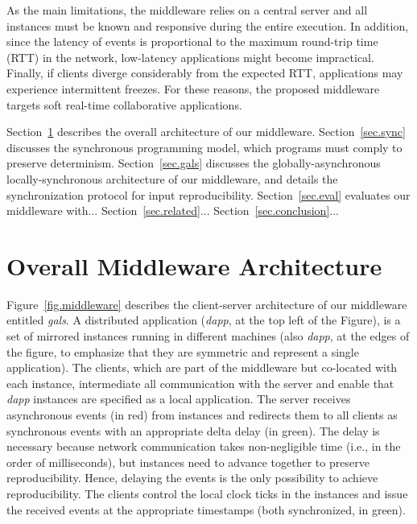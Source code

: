 \documentclass[sigplan,screen]{acmart}
\newcommand{\dapp}{\emph{dapp}\xspace}
\begin{document}
As the main limitations, the middleware relies on a central server and all
instances must be known and responsive during the entire execution.
In addition, since the latency of events is proportional to the maximum
round-trip time (RTT) in the network, low-latency applications might become
impractical.
Finally, if clients diverge considerably from the expected RTT, applications
may experience intermittent freezes.
For these reasons, the proposed middleware targets soft real-time collaborative
applications.

Section~\ref{sec.arch} describes the overall architecture of our middleware.
Section~\ref{sec.sync} discusses the synchronous programming model, which
programs must comply to preserve determinism.
Section~\ref{sec.gals} discusses the globally-asynchronous locally-synchronous
architecture of our middleware, and details the synchronization protocol for
input reproducibility.
Section~\ref{sec.eval} evaluates our middleware with...
Section~\ref{sec.related}...
Section~\ref{sec.conclusion}...

\section{Overall Middleware Architecture}
\label{sec.arch}

Figure~\ref{fig.middleware} describes the client-server architecture of our
middleware entitled \emph{gals}.
A distributed application (\dapp, at the top left of the Figure), is a set of
mirrored instances running in different machines (also \dapp, at the edges of
the figure, to emphasize that they are symmetric and represent a single
application).
The clients, which are part of the middleware but co-located with each
instance, intermediate all communication with the server and enable that \dapp
instances are specified as a local application.
The server receives asynchronous events (in red) from instances and redirects
them to all clients as synchronous events with an appropriate delta delay (in
green).
The delay is necessary because network communication takes non-negligible time
(i.e., in the order of milliseconds), but instances need to advance together
to preserve reproducibility.
Hence, delaying the events is the only possibility to achieve reproducibility.
The clients control the local clock ticks in the instances and issue the
received events at the appropriate timestamps (both synchronized, in green).
\end{document}
